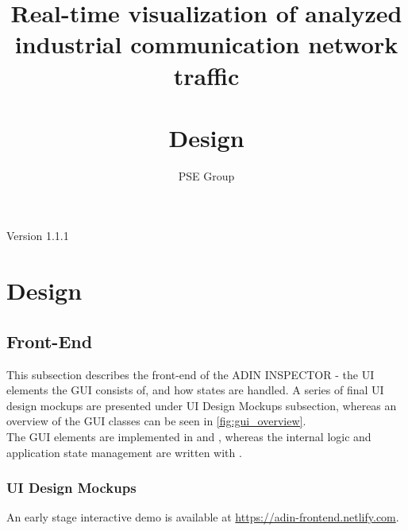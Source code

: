 \documentclass[oneside, english, final]{design}
\author{PSE Group}
\title{Real-time visualization of analyzed industrial communication network traffic\\ \hfill \\Design}
\begin{document}
\nocite{*}

\setpdf

\maketitle


\hfill

\begin{center}
	\large{Version 1.1.1}
\end{center}


\thispagestyle{empty}
\begin{abstract}
	\thispagestyle{empty}
\end{abstract}

\thispagestyle{empty}
\newpage
\thispagestyle{empty}
\tableofcontents
\cleardoublepage
\setcounter{page}{1}


\section{Design}\label{sec:intro}
\subsection{Front-End}
This subsection describes the front-end of the ADIN INSPECTOR - the UI elements the GUI consists of, and how states are handled. A series of final UI design mockups are presented under UI Design Mockups subsection, whereas an overview of the GUI classes can be seen in \autoref{fig:gui_overview}.\\

The GUI elements are implemented in \href{https://reactjs.org/}{\color{blue}{React}} and \href{https://material-ui.com/}{\color{blue}{Material UI}}, whereas the internal logic and application state management are written with \href{https://mobx.js.org/}{\color{blue}{MobX}}.

\subsubsection{UI Design Mockups}

An early stage interactive demo is available at \url{https://adin-frontend.netlify.com}.\\
\end{document}
